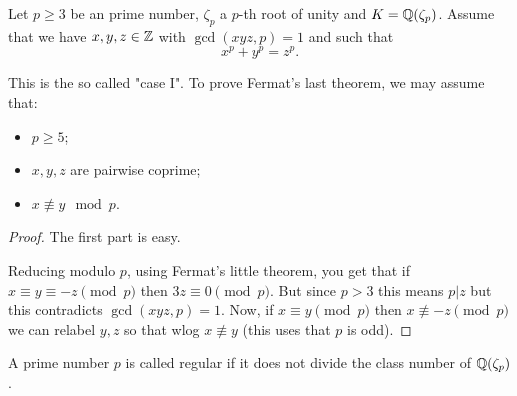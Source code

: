 \begin{lemma}\label{lemma:may_assume_coprime}
	\leanok

Let $p \geq 3$ be an prime number, $\zeta_p$ a $p$-th root of unity and $K=\mathbb{Q}(\zeta_p)$.  Assume that we have $x,y,z \in \mathbb{Z}$ with $\gcd(xyz,p)=1$ and such that \[x^p+y^p=z^p.\]

This is the so called "case I". To prove Fermat's last theorem, we may assume that:
\begin{itemize}
	\item $p \geq 5$;
	\item $x,y,z$ are pairwise coprime;
	\item $x \not \equiv y \mod p$.
\end{itemize}
\end{lemma}
\begin{proof}
	\leanok
The first part is easy.

Reducing modulo $p$, using Fermat's little theorem, you get that if $x \equiv y \equiv -z \pmod p$ then $3z \equiv 0 \pmod p$. But since $p >3$ this means $p |z$ but this contradicts $\gcd(xyz,p)=1$. Now, if $x \equiv y \pmod p$ then  $x \not \equiv -z \pmod p$ we can relabel $y,z$ so that wlog $x \not \equiv y$ (this uses that $p$ is odd).
\end{proof}

\begin{definition}\label{defn:is_regular_number}
	\leanok
	A prime number $p$ is called regular if it does not divide the class number of $\mathbb{Q}(\zeta_p)$.
\end{definition}

